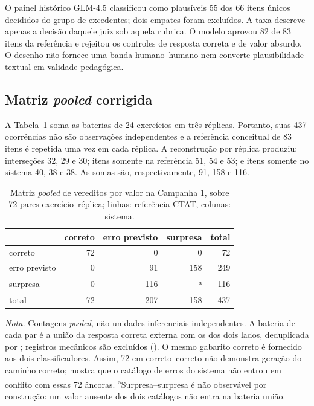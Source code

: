 \documentclass[11pt,a4paper]{article}
\newcommand{\NA}{\textemdash}
\begin{document}
O painel histórico GLM-4.5 classificou como plausíveis 55 dos 66 itens únicos decididos do grupo de excedentes; dois empates foram excluídos. A taxa descreve apenas a decisão daquele juiz sob aquela rubrica. O modelo aprovou 82 de 83 itens da referência e rejeitou os controles de resposta correta e de valor absurdo. O desenho não fornece uma banda humano--humano nem converte plausibilidade textual em validade pedagógica.

\subsection{Matriz \emph{pooled} corrigida}

A Tabela~\ref{tab:s-c1-matrix} soma as baterias de 24 exercícios em três réplicas. Portanto, suas 437 ocorrências não são observações independentes e a referência conceitual de 83 itens é repetida uma vez em cada réplica. A reconstrução por réplica produziu: interseções 32, 29 e 30; itens somente na referência 51, 54 e 53; e itens somente no sistema 40, 38 e 38. As somas são, respectivamente, 91, 158 e 116.

\begin{table}[H]
\centering
\caption{Matriz \emph{pooled} de vereditos por valor na Campanha 1, sobre 72 pares exercício--réplica; linhas: referência CTAT, colunas: sistema.}
\label{tab:s-c1-matrix}
\small
\setlength{\tabcolsep}{6pt}
\begin{tabular}{@{}lrrrr@{}}
\toprule
 & correto & erro previsto & surpresa & total \\
\midrule
correto & 72 & 0 & 0 & 72 \\
erro previsto & 0 & 91 & 158 & 249 \\
surpresa & 0 & 116 & \NA\textsuperscript{a} & 116 \\
\midrule
total & 72 & 207 & 158 & 437 \\
\bottomrule
\end{tabular}
\begin{minipage}{0.96\textwidth}
\footnotesize\emph{Nota.} Contagens \emph{pooled}, não unidades inferenciais independentes. A bateria de cada par é a união da resposta correta externa com os  dos dois lados, deduplicada por ; registros mecânicos são excluídos (). O mesmo gabarito correto é fornecido aos dois classificadores. Assim, 72 em correto--correto não demonstra geração do caminho correto; mostra que o catálogo de erros do sistema não entrou em conflito com essas 72 âncoras. \textsuperscript{a}Surpresa--surpresa é não observável por construção: um valor ausente dos dois catálogos não entra na bateria união.
\end{minipage}
\end{table}
\end{document}
